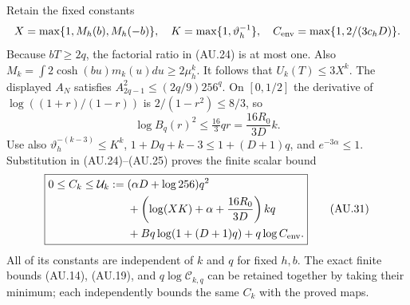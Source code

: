 Retain the fixed constants
\[
 X=\max\{1,M_h(b),M_h(-b)\},\quad
 K=\max\{1,\vartheta_h^{-1}\},\quad
 C_{\rm env}=\max\{1,2/(3c_hD)\}.
\]
Because $bT\ge2q$, the factorial ratio in (AU.24) is at most one.
Also $M_k=\int2\cosh(bu)m_k(u)du\ge2\mu_h^k$.
It follows that $U_k(T)\le3X^k$.
The displayed $A_N$ satisfies
$A_{2q-1}^2\le(2q/9)256^q$.
On $[0,1/2]$ the derivative of $\log((1+r)/(1-r))$ is
$2/(1-r^2)\le8/3$, so
\[
 \log B_q(r)^2\le\tfrac{16}{3}qr
                         =\frac{16R_0}{3D}k.             \tag{AU.30}
\]
Use also $\vartheta_h^{-(k-3)}\le K^k$,
$1+Dq+k-3\le1+(D+1)q$, and $e^{-3\alpha}\le1$.
Substitution in (AU.24)--(AU.25) proves the finite scalar bound
\[
 \boxed{\begin{aligned}
 0\le C_k\le\mathcal U_k:={}&(\alpha D+\log256)q^2\\
 &+\left(\log(XK)+\alpha+\frac{16R_0}{3D}\right)kq\\
 &+Bq\log(1+(D+1)q)+q\log C_{\rm env}.
 \end{aligned}}                                             \tag{AU.31}
\]
All of its constants are independent of $k$ and $q$ for fixed $h,b$.
The exact finite bounds (AU.14), (AU.19), and $q\log\mathcal C_{k,q}$
can be retained together by taking their minimum; each independently
bounds the same $C_k$ with the proved maps.


